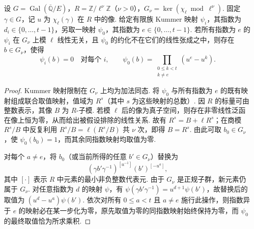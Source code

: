 \begin{lemma}
\label{lem:c-triangle-separate-kummer}
\emitthmsource
设 $G=\operatorname{Gal}(\overline{\mathbb Q}/E)$，$R=\mathbb Z/\ell^\nu\mathbb Z$（$\nu>0$），$G_\nu=\ker(\chi_\ell\bmod\ell^\nu)$. 固定 $\gamma\in G$，记 $u$ 为 $\chi_\ell(\gamma)$ 在 $R$ 中的像.
给定有限族 Kummer 映射 $\psi_i$，其指数为 $d_i\in\{0,\ldots,t-1\}$，另取一映射 $\psi_0$，其指数为 $e\in\{0,\ldots,t-1\}$. 若所有指数为 $e$ 的 $\psi_i$ 在 $G_\nu$ 上模 $\ell$ 线性无关，且 $\psi_0$ 的约化不在它们的线性张成之中，则存在 $b\in G_\nu$，使得
\[
  \psi_i(b)=0\quad\text{对每个 }i,\qquad
  \psi_0(b)=\prod_{\substack{0\le k<t\\k\ne e}}(u^e-u^k).
\]
\end{lemma}
\begin{proof}
Kummer 映射限制在 $G_\nu$ 上均为加法同态. 将 $\psi_0$ 与所有指数为 $e$ 的既有映射组成联合取值映射，值域为 $R^s$（其中 $s$ 为这些映射的总数）. 因 $R$ 的标量可由整数表示，其像 $B$ 为 $R$-子模. 若模 $\ell$ 后的像为真子空间，则存在非零线性泛函在像上恒为零，从而给出被假设排除的线性关系. 故有 $R^s=B+\ell R^s$；在商模 $R^s/B$ 中反复利用 $R^s/B=\ell(R^s/B)$ 共 $\nu$ 次，即得 $B=R^s$. 由此可取 $b_0\in G_\nu$，使 $\psi_0(b_0)=1$，而其余同指数映射均取值为零.

对每个 $a\ne e$，将 $b_0$（或当前所得的任意 $b'\in G_\nu$）替换为
\[
  (\gamma b'\gamma^{-1})^{[u^{-1}]}(b')^{[-u^a]},
\]
其中 $[\cdot]$ 表示 $R$ 中元素的最小非负整数代表元. 由于 $G_\nu$ 是正规子群，新元素仍属于 $G_\nu$. 对任意指数为 $d$ 的映射 $\psi$，有 $\psi(\gamma b'\gamma^{-1})=u^{d+1}\psi(b')$，故替换后的取值为 $(u^d-u^a)\psi(b')$. 依次对所有 $0\le a<t$ 且 $a\ne e$ 施行此操作，则指数异于 $e$ 的映射必在某一步化为零，原先取值为零的同指数映射始终保持为零，而 $\psi_0$ 的最终取值恰为所求乘积.
\end{proof}

